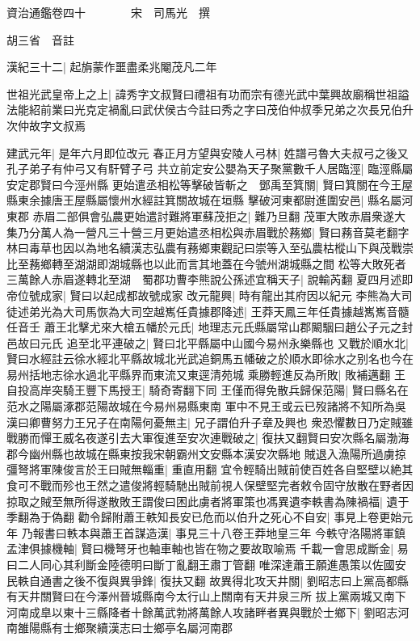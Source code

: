 資治通鑑卷四十　　　　宋　司馬光　撰

胡三省　音註

漢紀三十二|{
	起旃蒙作噩盡柔兆閹茂凡二年}


世祖光武皇帝上之上|{
	諱秀字文叔賢曰禮祖有功而宗有德光武中葉興故廟稱世祖謚法能紹前業曰光克定禍亂曰武伏侯古今註曰秀之字曰茂伯仲叔季兄弟之次長兄伯升次仲故字文叔焉}


建武元年|{
	是年六月即位改元}
春正月方望與安陵人弓林|{
	姓譜弓魯大夫叔弓之後又孔子弟子有仲弓又有馯臂子弓}
共立前定安公嬰為天子聚黨數千人居臨涇|{
	臨涇縣屬安定郡賢曰今涇州縣}
更始遣丞相松等擊破皆斬之　鄧禹至箕關|{
	賢曰箕關在今王屋縣東余據唐王屋縣屬懷州水經註箕關故城在垣縣}
擊破河東都尉進圍安邑|{
	縣名屬河東郡}
赤眉二部俱會弘農更始遣討難將軍蘇茂拒之|{
	難乃旦翻}
茂軍大敗赤眉衆遂大集乃分萬人為一營凡三十營三月更始遣丞相松與赤眉戰於蓩鄉|{
	賢曰蓩音莫老翻字林曰毒草也因以為地名續漢志弘農有蓩鄉東觀記曰崇等入至弘農枯樅山下與茂戰崇比至蓩鄉轉至湖湖即湖城縣也以此而言其地蓋在今虢州湖城縣之間}
松等大敗死者三萬餘人赤眉遂轉北至湖　蜀郡功曹李熊說公孫述宜稱天子|{
	說輸芮翻}
夏四月述即帝位號成家|{
	賢曰以起成都故號成家}
改元龍興|{
	時有龍出其府因以紀元}
李熊為大司徒述弟光為大司馬恢為大司空越嶲任貴據郡降述|{
	王莽天鳳三年任貴據越嶲嶲音髓任音壬}
蕭王北擊尤來大槍五幡於元氏|{
	地理志元氏縣屬常山郡闞駰曰趙公子元之封邑故曰元氏}
追至北平連破之|{
	賢曰北平縣屬中山國今易州永樂縣也}
又戰於順水北|{
	賢曰水經註云徐水經北平縣故城北光武追銅馬五幡破之於順水即徐水之别名也今在易州括地志徐水過北平縣界而東流又東逕清苑城}
乘勝輕進反為所敗|{
	敗補邁翻}
王自投高岸突騎王豐下馬授王|{
	騎奇寄翻下同}
王僅而得免散兵歸保范陽|{
	賢曰縣名在范水之陽屬涿郡范陽故城在今易州易縣東南}
軍中不見王或云已歿諸將不知所為吳漢曰卿曹努力王兄子在南陽何憂無主|{
	兄子謂伯升子章及興也}
衆恐懼數日乃定賊雖戰勝而憚王威名夜遂引去大軍復進至安次連戰破之|{
	復扶又翻賢曰安次縣名屬渤海郡今幽州縣也故城在縣東按我宋朝霸州文安縣本漢安次縣地}
賊退入漁陽所過虜掠彊弩將軍陳俊言於王曰賊無輜重|{
	重直用翻}
宜令輕騎出賊前使百姓各自堅壁以絶其食可不戰而殄也王然之遣俊將輕騎馳出賊前視人保壁堅完者敕令固守放散在野者因掠取之賊至無所得遂散敗王謂俊曰困此虜者將軍策也馮異遺李軼書為陳禍福|{
	遺于季翻為于偽翻}
勸令歸附蕭王軼知長安已危而以伯升之死心不自安|{
	事見上卷更始元年}
乃報書曰軼本與蕭王首謀造漢|{
	事見三十八卷王莽地皇三年}
今軼守洛陽將軍鎮孟津俱據機軸|{
	賢曰機弩牙也軸車軸也皆在物之要故取喻焉}
千載一會思成斷金|{
	易曰二人同心其利斷金陸德明曰斷丁亂翻王肅丁管翻}
唯深達蕭王願進愚策以佐國安民軼自通書之後不復與異爭鋒|{
	復扶又翻}
故異得北攻天井關|{
	劉昭志曰上黨高都縣有天井關賢曰在今澤州晉城縣南今太行山上關南有天井泉三所}
拔上黨兩城又南下河南成臯以東十三縣降者十餘萬武勃將萬餘人攻諸畔者異與戰於士鄉下|{
	劉昭志河南雒陽縣有士鄉聚續漢志曰士鄉亭名屬河南郡}
